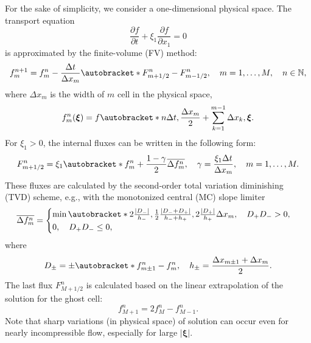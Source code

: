 \documentclass[]{elsarticle} %
\newcommand{\pder}[2][]{\frac{\partial#1}{\partial#2}}
\DeclarePairedDelimiter\autobracket()       %
\newcommand{\br}[1]{\autobracket*{#1}}
\newcommand{\bxi}{\boldsymbol{\xi}}
\begin{document}
For the sake of simplicity, we consider a one-dimensional physical space.
The transport equation
\begin{equation}\label{eq:transport}
    \pder[f]{t} + \xi_1\pder[f]{x_1} = 0
\end{equation}
is approximated by the finite-volume (FV) method:
\begin{equation}\label{eq:finite_volume}
    f^{n+1}_m = f^n_m - \frac{\Delta{t}}{\Delta{x_m}}\br{F^n_{m+1/2}-F^n_{m-1/2}}, \quad
    m = 1,\dots,M, \quad n\in\mathbb{N},
\end{equation}
where \(\Delta{x_m}\) is the width of \(m\) cell in the physical space,
\begin{equation}\label{eq:vdf_fv}
    f^n_m(\bxi) = f\br{n\Delta{t}, \frac{\Delta{x_m}}2 + \sum_{k=1}^{m-1}\Delta{x_k}, \bxi}.
\end{equation}
For \(\xi_1>0\), the internal fluxes can be written in the following form:
\begin{equation}\label{eq:internal_fluxes}
    F_{m+1/2}^n = \xi_1\br{ f_m^n + \frac{1-\gamma}2\overline{\Delta{f_m^n}}},
    \quad \gamma = \frac{\xi_1\Delta{t}}{\Delta{x_m}}, \quad m = 1,\dots,M.
\end{equation}
These fluxes are calculated by the second-order total variation diminishing (TVD) scheme,
e.g., with the monotonized central (MC) slope limiter
\begin{equation}\label{eq:limiter}
    \overline{\Delta{f_m^n}} = \begin{cases}\min\br{
         2\frac{|D_-|}{h_-}, \frac12\frac{|D_-+D_+|}{h_-+h_+}, 2\frac{|D_+|}{h_+}
    }\Delta{x_m}, \quad D_+D_- > 0, \\
    0, \quad D_+D_- \leq 0,
    \end{cases}
\end{equation}
where
\begin{equation}\label{eq:differences}
    D_\pm = \pm\br{f_{m\pm1}^n - f_m^n}, \quad h_\pm = \frac{\Delta{x_{m\pm1}} + \Delta{x_m}}2.
\end{equation}
The last flux \(F_{M+1/2}^n\) is calculated based on the linear extrapolation of the solution for the ghost cell:
\begin{equation}\label{eq:last_ghost}
    f_{M+1}^n = 2f_M^n - f_{M-1}^n.
\end{equation}
Note that sharp variations (in physical space) of solution can occur even for nearly incompressible flow,
especially for large \(|\bxi|\).
\end{document}
